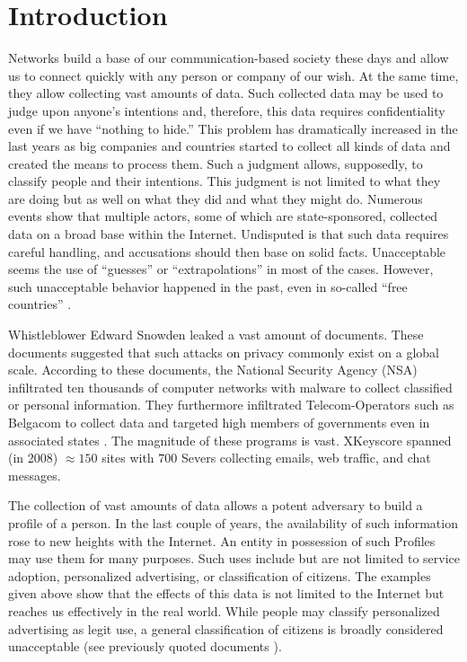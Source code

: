 \documentclass[acmsmall, screen, review]{acmart}
\begin{document}
\section{Introduction\label{sec:introduction}}
Networks build a base of our communication-based society these days and allow us to connect quickly with any person or company of our wish. At the same time, they allow collecting vast amounts of data. Such collected data may be used to judge upon anyone's intentions and, therefore, this data requires confidentiality even if we have ``nothing to hide.'' This problem has dramatically increased in the last years as big companies and countries started to collect all kinds of data and created the means to process them. Such a judgment allows, supposedly, to classify people and their intentions. This judgment is not limited to what they are doing but as well on what they did and what they might do. Numerous events show that multiple actors, some of which are state-sponsored, collected data on a broad base within the Internet. Undisputed is that such data requires careful handling, and accusations should then base on solid facts. Unacceptable seems the use of ``guesses'' or ``extrapolations'' in most of the cases. However, such unacceptable behavior happened in the past, even in so-called ``free countries'' \cite{Leuenberger1989}.

Whistleblower Edward Snowden leaked a vast amount of documents. These documents suggested that such attacks on privacy commonly exist on a global scale. According to these documents, the National Security Agency (NSA) infiltrated ten thousands of computer networks with malware to collect classified or personal information. They furthermore infiltrated Telecom-Operators such as Belgacom to collect data and targeted high members of governments even in associated states \cite{NCR2013,XKeyscore,Ball2013,Ackerman2013,Greenberg2013}. The magnitude of these programs is vast. XKeyscore spanned (in 2008) $\approx150$ sites with $700$ Severs collecting emails, web traffic, and chat messages.

The collection of vast amounts of data allows a potent adversary to build a  profile of a person. In the last couple of years, the availability of such information rose to new heights with the Internet. An entity in possession of such Profiles may use them for many purposes. Such uses include but are not limited to service adoption, personalized advertising, or classification of citizens. The examples given above show that the effects of this data is not limited to the Internet but reaches us effectively in the real world. While people may classify personalized advertising as legit use, a general classification of citizens is broadly considered unacceptable (see previously quoted documents \cite{NCR2013,XKeyscore,Ball2013,Greenberg2013,Leuenberger1989}).
\end{document}
